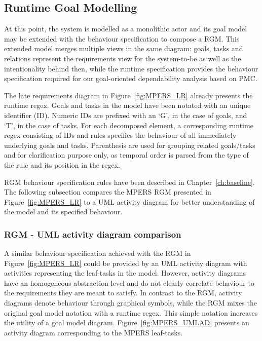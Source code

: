 
\subsection{Runtime Goal Modelling}

At this point, the system is modelled as a monolithic actor and its goal model may be extended with the behaviour specification to compose a RGM. This extended model merges multiple views in the same diagram: goals, tasks and relations represent the requirements view for the system-to-be as well as the intentionality behind then, while the runtime specification provides the behaviour specification required for our goal-oriented dependability analysis based on PMC. 

The late requirements diagram in Figure~\ref{fig:MPERS_LR} already presents the runtime regex. Goals and tasks in the model have been notated with an unique identifier (ID). Numeric IDs are prefixed with an `G', in the case of goals, and `T', in the case of tasks. For each decomposed element, a corresponding runtime regex consisting of IDs and rules specifies the behaviour of all immediately underlying goals and tasks. Parenthesis are used for grouping related goals/tasks and for clarification purpose only, as temporal order is parsed from the type of the rule and its position in the regex.

RGM behaviour specification rules have been described in Chapter~\ref{ch:baseline}. The following subsection compares the MPERS RGM presented in Figure~\ref{fig:MPERS_LR} to a UML activity diagram for better understanding of the model and its specified behaviour.



\subsubsection{RGM - UML activity diagram comparison}\label{ssec:RGM-UML}

A similar behaviour specification achieved with the RGM in Figure~\ref{fig:MPERS_LR} could be provided by an UML activity diagram with activities representing the leaf-tasks in the model. However, activity diagrams have an homogeneous abstraction level and do not clearly correlate behaviour to the requirements they are meant to satisfy. In contrast to the RGM, activity diagrams denote behaviour through graphical symbols, while the RGM mixes the original goal model notation with a runtime regex. This simple notation increases the utility of a goal model diagram. Figure~\ref{fig:MPERS_UMLAD} presents an activity diagram corresponding to the MPERS leaf-tasks. 


